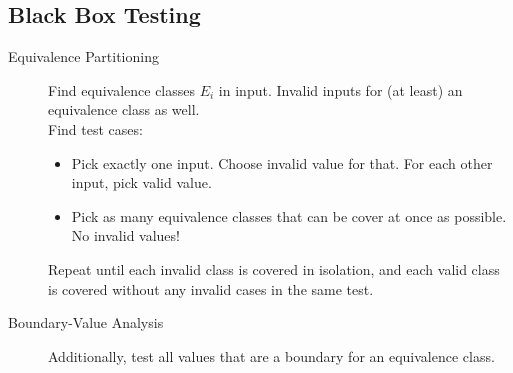 \subsection{Black Box Testing}

\begin{description}
	\item[Equivalence Partitioning] Find equivalence classes $E_i$ in input.
	Invalid inputs for (at least) an equivalence class as well. \\ Find test
	cases:
	\begin{itemize}
		\item Pick exactly one input. Choose invalid value for that. For each
		other input, pick valid value.
		\item Pick as many equivalence classes that can be cover at once as
		possible. No invalid values!
	\end{itemize}
	Repeat until each invalid class is covered in isolation, and each valid
	class is covered without any invalid cases in the same test.

	\item[Boundary-Value Analysis] Additionally, test all values that are a
	boundary for an equivalence class.


\end{description}
